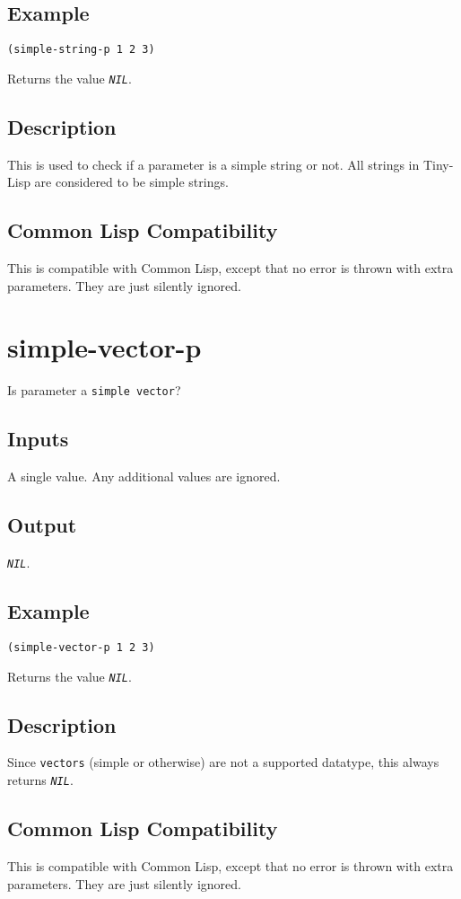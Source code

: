 \documentclass[10pt, openany]{book}
\newcommand{\constant}[1]{\emph{\texttt{#1}}}
\newcommand{\datatype}[1]{\texttt{#1}}
\newcommand{\tl}{Tiny-Lisp}
\newcommand{\cl}{Common Lisp}
\begin{document}
\subsection{Example}
\begin{lstlisting}
(simple-string-p 1 2 3)
\end{lstlisting}
Returns the value \constant{NIL}.
\subsection{Description}
This is used to check if a parameter is a simple string or not.  All strings in \tl{} are considered to be simple strings.
\subsection{Common Lisp Compatibility}
This is compatible with \cl, except that no error is thrown with extra parameters.  They are just silently ignored.

\section{simple-vector-p}
Is parameter a \datatype{simple vector}?
\subsection{Inputs}
A single value.  Any additional values are ignored.
\subsection{Output}
\constant{NIL}.
\subsection{Example}
\begin{lstlisting}
(simple-vector-p 1 2 3)
\end{lstlisting}
Returns the value \constant{NIL}.
\subsection{Description}
Since \datatype{vectors} (simple or otherwise) are not a supported datatype, this always returns \constant{NIL}.
\subsection{Common Lisp Compatibility}
This is compatible with \cl, except that no error is thrown with extra parameters.  They are just silently ignored.
\end{document}
